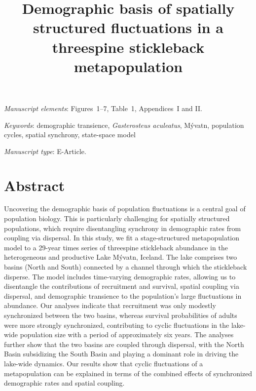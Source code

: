 \documentclass[11pt]{article}
\title{Demographic basis of spatially structured fluctuations in
        a threespine stickleback metapopulation}
\date{}
\begin{document}
\maketitle

\bigskip

\textit{Manuscript elements}: Figures~1--7, Table~1, Appendices~I and II. 

\bigskip

\textit{Keywords}: {demographic transience, \textit{Gasterosteus aculeatus},
                    M\'{y}vatn, population cycles, spatial synchrony, state-space model}
                    
\bigskip

\textit{Manuscript type}: E-Article. 

\bigskip


\linenumbers{}

\newpage{}






\section*{Abstract} \label{abstract}

Uncovering the demographic basis of population fluctuations 
is a central goal of population biology.
This is particularly challenging for spatially structured populations, 
which require disentangling synchrony in demographic rates from
coupling via dispersal. 
In this study, we fit a stage-structured metapopulation model to a 29-year times series 
of threespine stickleback abundance in the heterogeneous 
and productive Lake M\'{y}vatn, Iceland. 
The lake comprises two basins (North and South) connected by a channel 
through which the stickleback disperse. 
The model includes time-varying demographic rates, 
allowing us to disentangle the contributions of recruitment and survival, 
spatial coupling via dispersal, and demographic transience 
to the population’s large fluctuations in abundance. 
Our analyses indicate that recruitment was only modestly synchronized between the two basins, 
whereas survival probabilities of adults were more strongly synchronized, 
contributing to cyclic fluctuations in the lake-wide population size 
with a period of approximately six years. 
The analyses further show that the two basins are coupled through dispersal, 
with the North Basin subsidizing the South Basin and playing a dominant role 
in driving the lake-wide dynamics.
Our results show that cyclic fluctuations of a metapopulation 
can be explained in terms of the combined effects 
of synchronized demographic rates and spatial coupling.
\end{document}
